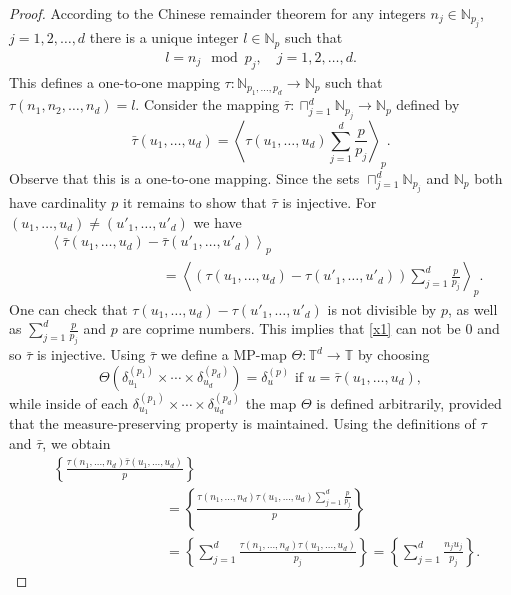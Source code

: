 \documentclass[12pt,reqno,fleqn]{amsart}
\theoremstyle{plain} %
\theoremstyle{remark}
\def\ZN{\ensuremath{\mathbb N}}
\def\ZT{\ensuremath{\mathbb T}}
\theoremstyle{plain}
\numberwithin{equation}{section}
\newcommand {\e }[1]{\eqref{#1}}
\begin{document}
\begin{proof}
According to the Chinese remainder theorem for any integers  $n_j\in \ZN_{p_j}$, $j=1,2,\ldots,d$ there is a unique integer $l\in \ZN_{p}$ such that
\begin{align*}
	l=n_j\mod p_j,\quad j=1,2,\ldots,d.
\end{align*}
This defines a one-to-one mapping  $\tau:\ZN_{p_1,\ldots,p_d}\to \ZN_{p}$ such that $\tau(n_1,n_2,\ldots, n_d)=l$. Consider the mapping $\bar \tau:\sqcap_{j=1}^d\ZN_{p_j}\to \ZN_{p}$ defined by
\begin{equation*}
	\bar\tau(u_1,\ldots,u_d)=\left\langle\tau(u_1,\ldots,u_d)\sum_{j=1}^d\frac{p}{p_j}\right\rangle_p.
\end{equation*}
Observe that this is a one-to-one mapping. 
Since the sets $\sqcap_{j=1}^d\ZN_{p_j}$ and $\ZN_{p}$ both have cardinality $p$ it remains to show that  $\bar \tau$ is injective. For $ (u_1,\ldots,u_d)\neq (u'_1,\ldots,u'_d)$ we have
	\begin{align}
		&\left\langle\bar \tau (u_1,\ldots,u_d)-\bar \tau(u'_1,\ldots,u'_d)\right\rangle_p\\
		&\qquad\qquad\qquad\qquad =\left\langle	(\tau (u_1,\ldots,u_d)- \tau(u'_1,\ldots,u'_d))\sum_{j=1}^d\frac{p}{p_j}\right\rangle_p.\label{x1}
	\end{align}
	One can check that $\tau (u_1,\ldots,u_d)- \tau(u'_1,\ldots,u'_d)$ is not divisible by $p$, as well as  $\sum_{j=1}^d\frac{p}{p_j}$ and $p$ are coprime numbers. This implies that \e{x1} can not be $0$ and so $\bar \tau$ is injective. Using $\bar\tau$ we define a MP-map $\Theta:\ZT^d\to \ZT$ by choosing 
	\begin{equation*}
		\Theta(\delta_{u_1}^{(p_1)}\times \cdots\times \delta_{u_d}^{(p_d)})=\delta^{(p)}_u \text{ if } u=\bar \tau(u_1,\ldots,u_d),
	\end{equation*}
while inside of each $\delta_{u_1}^{(p_1)}\times \cdots\times \delta_{u_d}^{(p_d)}$ the map $\Theta$ is defined arbitrarily,  provided that the measure-preserving property is maintained. Using the definitions of $\tau$ and $\bar \tau$, we obtain
\begin{align*}
	&\left\{\frac{\tau(n_1,\ldots,n_d)\bar \tau(u_1,\ldots,u_d)}{p}\right\}\\
	&\qquad\qquad\qquad\qquad=	\left\{\frac{\tau(n_1,\ldots,n_d)\tau(u_1,\ldots,u_d)\sum_{j=1}^d\frac{p}{p_j}}{p}\right\}\\
	&\qquad\qquad\qquad\qquad=	\left\{\sum_{j=1}^d\frac{\tau(n_1,\ldots,n_d)\tau(u_1,\ldots,u_d)}{p_j}\right\}=\left\{\sum_{j=1}^d\frac{n_ju_j}{p_j}\right\}.

\end{align*}
\end{proof}
\end{document}
